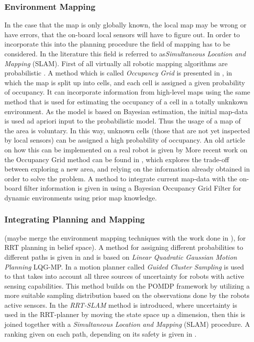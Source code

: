 \subsubsection{Environment Mapping}
In the case that the map is only globally known, the local map may be wrong or
have errors, that the on-board local sensors will have to figure out. In order
to incorporate this into the planning procedure the field of mapping has to be
considered. In the literature this field is referred to as\textit{Simultaneous
  Location and Mapping} (SLAM). First of all virtually all robotic mapping
algorithms are probabilistic \cite{thrunRoboticMappingSurvey}. %
A method which is called \textit{Occupancy Grid} is presented in
\cite{elfes1989using}, in which the map is split up into cells, and each cell is
assigned a given probability of occupancy. It can incorporate information from
high-level maps using the same method that is used for estimating the occupancy
of a cell in a totally unknkown environment. As the model is based on Bayesian
estimation, the initial map-data is used ad apriori input to the probabilistic
model. Thus the usage of a map of the area is voluntary. In this way, unknown
cells (those that are not yet inspected by local sensors) can be assigned a high
probability of occupancy. An old article on how this can be implemented on a
real robot is given by \cite[Krugman]{kriegman1987mobile} More recent work on
the Occupancy Grid method can be found in
\cite{carrilloAutonomousRoboticExploration2015}, which explores the trade-off
between exploring a new area, and relying on the information already obtained in
order to solve the problem. A method to integrate current map-data with the
on-board filter information is given in \cite{gindeleBayesianOccupancyGrid2009}
using a Bayesian Occupancy Grid Filter for dynamic environments using prior map
knowledge.
\subsubsection{Integrating Planning and Mapping}
(maybe merge the environment mapping techniques with the work done in
\cite[Bry]{bryRapidlyexploringRandomBelief2011}), for RRT planning in belief
space). A method for assigning different probabilities to different paths is
given in \cite{vandenbergLQGMPOptimizedPath2011} and is based on \textit{Linear
  Quadratic Gaussian Motion Planning} LQG-MP. In
\cite{kurniawatiGlobalMotionPlanning2012} a motion planner called \textit{Guided
  Cluster Sampling} is used to that takes into account all three sources of
uncertainty for robots with active sensing capabilities. This method builds on
the POMDP framework by utilizing a more suitable sampling distribution based on
the observations done by the robots active sensors. In
\cite{yifenghuangRRTSLAMMotionPlanning2008} the \textit{RRT-SLAM} method is
introduced, where uncertainty is used in the RRT-planner by moving the state
space up a dimension, then this is joined together with a \textit{Simultaneous
  Location and Mapping} (SLAM) procedure. A ranking given on each path,
depending on its safety is given in
\cite{blakeEfficientComputationCollision2018}.

